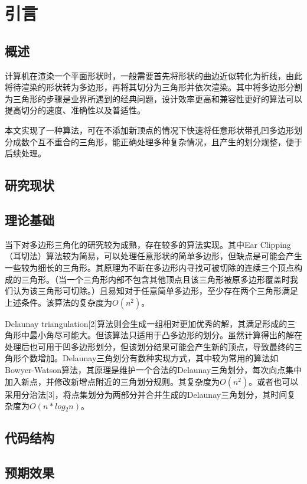 
\chapter{引言}

\section{概述}
  计算机在渲染一个平面形状时，一般需要首先将形状的曲边近似转化为折线，由此将待渲染的形状转为多边形，再将其切分为三角形并依次渲染。其中将多边形分割为三角形的步骤是业界所遇到的经典问题，设计效率更高和兼容性更好的算法可以提高切分的速度、准确性以及普适性。
  
  本文实现了一种算法，可在不添加新顶点的情况下快速将任意形状带孔凹多边形划分成数个互不重合的三角形，能正确处理多种复杂情况，且产生的划分规整，便于后续处理。
\section{研究现状}


\section{理论基础}
当下对多边形三角化的研究较为成熟，存在较多的算法实现。其中Ear Clipping（耳切法）算法较为简易，可以处理任意形状的简单多边形，但缺点是可能会产生一些较为细长的三角形。其原理为不断在多边形内寻找可被切除的连续三个顶点构成的三角形。（当一个三角形内部不包含其他顶点且该三角形被原多边形覆盖时我们认为该三角形可切除。）且易知对于任意简单多边形，至少存在两个三角形满足上述条件。该算法的复杂度为\(O(n^2)\)。

Delaunay triangulation[2]算法则会生成一组相对更加优秀的解，其满足形成的三角形中最小角尽可能大。但该算法只适用于凸多边形的划分。虽然计算得出的解在处理后也可用于凹多边形划分，但该划分结果可能会产生新的顶点，导致最终的三角形个数增加。Delaunay三角划分有数种实现方式，其中较为常用的算法如Bowyer-Watson算法，其原理是维护一个合法的Delaunay三角划分，每次向点集中加入新点，并修改新增点附近的三角划分规则。其复杂度为\(O(n^2)\)。或者也可以采用分治法[3]，将点集划分为两部分并合并生成的Delaunay三角划分，其时间复杂度为\(O(n*log⁡_2n)\)。

\section{代码结构}


\section{预期效果}


